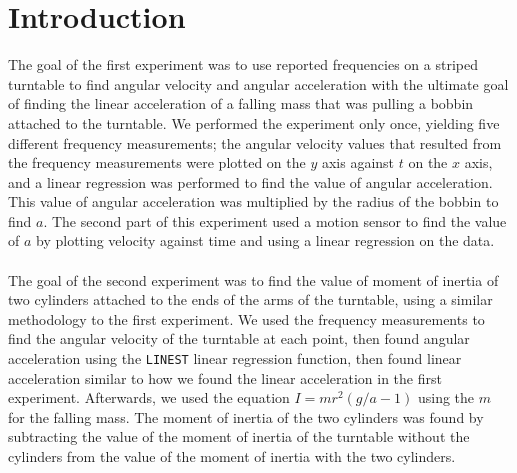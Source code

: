 \documentclass[9pt]{extarticle}
\begin{document}
{\section*{Introduction}
The goal of the first experiment was to use reported frequencies on a striped turntable to find angular velocity and angular acceleration with the ultimate goal of finding the linear acceleration of a falling mass that was pulling a bobbin attached to the turntable. We performed the experiment only once, yielding five different frequency measurements; the angular velocity values that resulted from the frequency measurements were plotted on the $y$ axis against $t$ on the $x$ axis, and a linear regression was performed to find the value of angular acceleration. This value of angular acceleration was multiplied by the radius of the bobbin to find $a$. The second part of this experiment used a motion sensor to find the value of $a$ by plotting velocity against time and using a linear regression on the data.\\
\\
The goal of the second experiment was to find the value of moment of inertia of two cylinders attached to the ends of the arms of the turntable, using a similar methodology to the first experiment. We used the frequency measurements to find the angular velocity of the turntable at each point, then found angular acceleration using the \texttt{LINEST} linear regression function, then found linear acceleration similar to how we found the linear acceleration in the first experiment. Afterwards, we used the equation $I = mr^2(g/a-1)$ using the $m$ for the falling mass. The moment of inertia of the two cylinders was found by subtracting the value of the moment of inertia of the turntable without the cylinders from the value of the moment of inertia with the two cylinders.
}
\end{document}
